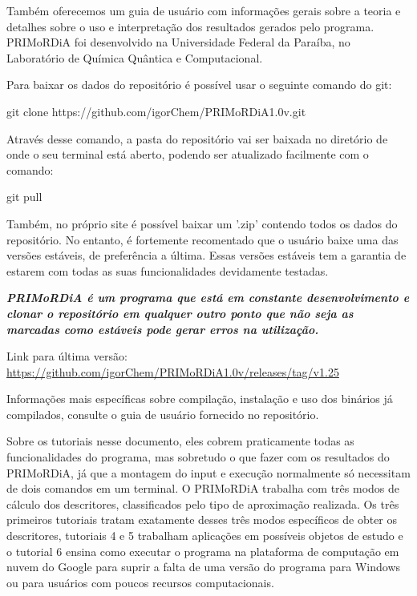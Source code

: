 \documentclass[a4paper,11pt]{refart}
\begin{document}
Também oferecemos um guia de usuário com informações gerais sobre a teoria e detalhes sobre o uso e interpretação dos resultados gerados pelo programa.  PRIMoRDiA foi desenvolvido na Universidade Federal da Paraíba, no Laboratório de Química Quântica e Computacional.

Para baixar os dados do repositório é possível usar o seguinte comando do git:

\hspace*{-\leftmarginwidth}
\begin{minipage}{\fullwidth}
	\begin{commandshell}git clone https://github.com/igorChem/PRIMoRDiA1.0v.git\end{commandshell}
\end{minipage}

Através desse comando, a pasta do repositório vai ser baixada no diretório de onde o seu terminal está aberto, podendo ser atualizado facilmente com o comando: 

\hspace*{-\leftmarginwidth}
\begin{minipage}{\fullwidth}
	\begin{commandshell}git pull\end{commandshell}
\end{minipage}

Também, no próprio site é possível baixar um '.zip' contendo todos os dados do repositório. 
No entanto, é fortemente recomentado que o usuário baixe uma das versões estáveis, de preferência a última. Essas versões estáveis tem a garantia de estarem com todas as suas funcionalidades devidamente testadas. 

\emph{\textbf{PRIMoRDiA é um programa que está em constante desenvolvimento e clonar o repositório em qualquer outro ponto que não seja as marcadas como estáveis pode gerar erros na utilização. }}

Link para última versão: \url{https://github.com/igorChem/PRIMoRDiA1.0v/releases/tag/v1.25}

Informações mais específicas sobre compilação, instalação e uso dos binários já compilados, consulte o guia de usuário fornecido no repositório. 

Sobre os tutoriais nesse documento, eles cobrem praticamente todas as funcionalidades do programa, mas sobretudo o que fazer com os resultados do PRIMoRDiA, já que a montagem do input e execução normalmente só necessitam de dois comandos em um terminal. O PRIMoRDiA trabalha com três modos de cálculo dos descritores, classificados pelo tipo de aproximação realizada. Os três primeiros tutoriais tratam exatamente desses três modos específicos de obter os descritores, tutoriais 4 e 5 trabalham aplicações em possíveis objetos de estudo e o tutorial 6 ensina como executar o programa na plataforma de computação em nuvem do Google para suprir a falta de uma versão do programa para Windows ou para usuários com poucos recursos computacionais.  
\end{document}
